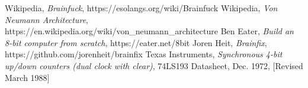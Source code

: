 \begin{thebibliography}{99}
 Wikipedia, \emph{Brainfuck}, https://esolangs.org/wiki/Brainfuck
 Wikipedia, \emph{Von Neumann Architecture},\\https://en.wikipedia.org/wiki/von\_neumann\_architecture
 Ben Eater, \emph{Build an 8-bit computer from scratch}, https://eater.net/8bit
 Joren Heit, \emph{Brainfix}, https://github.com/jorenheit/brainfix
 Texas Instruments, \emph{Synchronous 4-bit up/down counters (dual clock with clear)}, 74LS193 Datasheet, Dec. 1972, [Revised March 1988]
\end{thebibliography}

